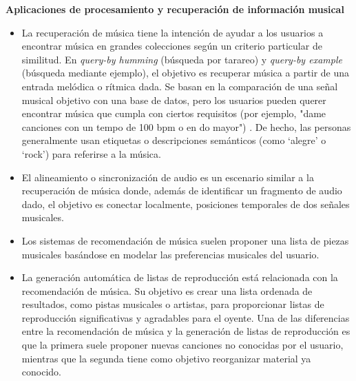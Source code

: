 \textbf{Aplicaciones de procesamiento y recuperación de información musical}
\begin{itemize}
    \item La recuperación de música tiene la intención de ayudar a los usuarios a encontrar música en grandes colecciones según un criterio particular de similitud. En \textit{query-by humming} (búsqueda por tarareo) y \textit{query-by example} (búsqueda mediante ejemplo), el objetivo es recuperar música a partir de una entrada melódica o rítmica dada. Se basan en la comparación de una señal musical objetivo con una base de datos, pero los usuarios pueden querer encontrar música que cumpla con ciertos requisitos (por ejemplo, "dame canciones con un tempo de 100 bpm o en do mayor") \cite{Schedl2014MusicIR}. De hecho, las personas generalmente usan etiquetas o descripciones semánticos (como `alegre'  o `rock') para referirse a la música. 
    \item El alineamiento o sincronización de audio es un escenario similar a la recuperación de música donde, además de identificar un fragmento de audio dado, el objetivo es conectar localmente, posiciones temporales de dos señales musicales.
    \item Los sistemas de recomendación de música suelen proponer una lista de piezas musicales basándose en modelar las preferencias musicales del usuario.
    \item La generación automática de listas de reproducción está relacionada con la recomendación de música. Su objetivo es crear una lista ordenada de resultados, como pistas musicales o artistas, para proporcionar listas de reproducción significativas y agradables para el oyente. Una de las diferencias entre la recomendación de música y la generación de listas de reproducción es que la primera suele proponer nuevas canciones no conocidas por el usuario, mientras que la segunda tiene como objetivo reorganizar material ya conocido.
\end{itemize}

